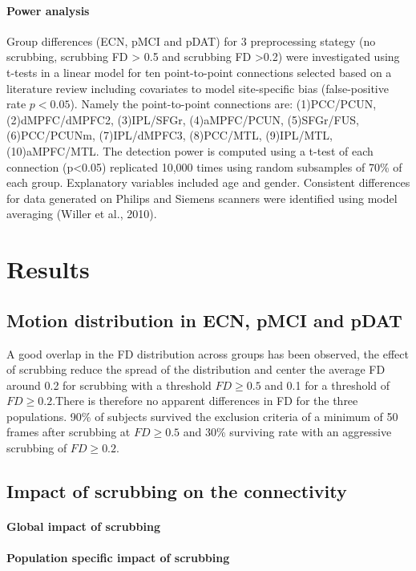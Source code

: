 \documentclass[authoryear,preprint,review]{elsarticle}
\begin{document}
\paragraph{Power analysis} 
Group differences (ECN, pMCI and pDAT) for 3 preprocessing stategy (no scrubbing, scrubbing FD > 0.5 and scrubbing FD >0.2) were investigated using t-tests in a linear model for ten point-to-point connections selected based on a literature review including covariates to model site-specific bias (false-positive rate $p<0.05$). Namely the point-to-point connections are: (1)PCC/PCUN, (2)dMPFC/dMPFC2, (3)IPL/SFGr, (4)aMPFC/PCUN, (5)SFGr/FUS, (6)PCC/PCUNm, (7)IPL/dMPFC3, (8)PCC/MTL, (9)IPL/MTL, (10)aMPFC/MTL. The detection power is computed using a t-test of each connection (p<0.05) replicated 10,000 times using random subsamples of 70\% of each group. Explanatory variables included age and gender. Consistent differences for data generated on Philips and Siemens scanners were identified using model averaging (Willer et al., 2010).


\section{Results} 

\subsection{Motion distribution in ECN, pMCI and pDAT} 
A good overlap in the FD distribution across groups has been observed, the effect of scrubbing reduce the spread of the distribution and center the average FD around 0.2 for scrubbing with a threshold $FD\geq0.5$ and 0.1 for a threshold of $FD\geq0.2$.There is therefore no apparent differences in FD for the three populations. 90\% of subjects survived the exclusion criteria of a minimum of 50 frames after scrubbing at $FD\geq0.5$ and 30\% surviving rate with an aggressive scrubbing of $FD\geq0.2$.

\subsection{Impact of scrubbing on the connectivity}
\paragraph{Global impact of scrubbing}
\paragraph{Population specific impact of scrubbing}
\end{document}
